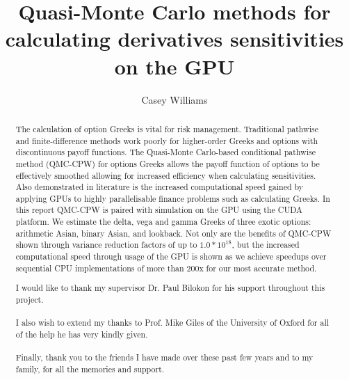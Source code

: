 \documentclass[a4paper, twoside]{report}
\title{Quasi-Monte Carlo methods for calculating derivatives sensitivities on the GPU}
\author{Casey Williams}
\begin{document}


\begin{abstract}
The calculation of option Greeks is vital for risk management. Traditional pathwise and finite-difference methods work poorly for higher-order Greeks and options with discontinuous payoff functions. The Quasi-Monte Carlo-based conditional pathwise method (QMC-CPW) for options Greeks allows the payoff function of options to be effectively smoothed allowing for increased efficiency when calculating sensitivities. Also demonstrated in literature is the increased computational speed gained by applying GPUs to highly parallelisable finance problems such as calculating Greeks. In this report QMC-CPW is paired with simulation on the GPU using the CUDA platform. We estimate the delta, vega and gamma Greeks of three exotic options: arithmetic Asian, binary Asian, and lookback. Not only are the benefits of QMC-CPW shown through variance reduction factors of up to $1.0 * 10^{18}$, but the increased computational speed through usage of the GPU is shown as we achieve speedups over sequential CPU implementations of more than $200$x for our most accurate method.
\end{abstract}


\renewcommand{\abstractname}{Acknowledgements}
\begin{abstract}
I would like to thank my supervisor Dr. Paul Bilokon for his support throughout this project.
\\
\\
I also wish to extend my thanks to Prof. Mike Giles of the University of Oxford for all of the help he has very kindly given.
\\
\\
Finally, thank you to the friends I have made over these past few years and to my family, for all the memories and support.
\end{abstract}

\tableofcontents 
\listoffigures
\listoftables
\listofalgorithms




%
%









\end{document}
